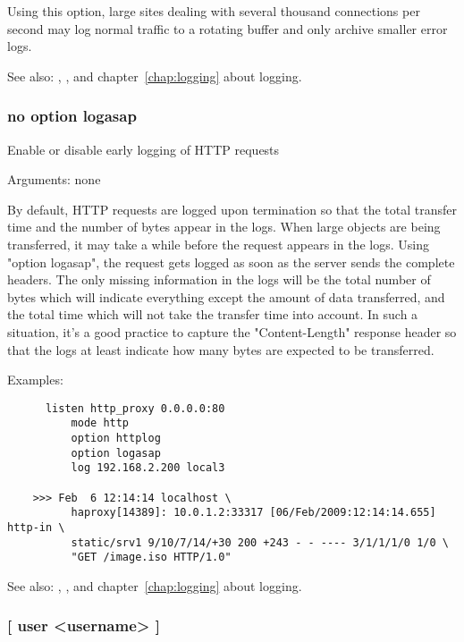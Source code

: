   Using this option, large sites dealing with several thousand connections per
  second may log normal traffic to a rotating buffer and only archive smaller
  error logs.


See also: , ,  and chapter~\ref{chap:logging} about
             logging.

\subsubsection[logasap]{}
\subsubsection*{no option logasap}


  Enable or disable early logging of HTTP requests


  Arguments: none

  By default, HTTP requests are logged upon termination so that the total
  transfer time and the number of bytes appear in the logs. When large objects
  are being transferred, it may take a while before the request appears in the
  logs. Using "option logasap", the request gets logged as soon as the server
  sends the complete headers. The only missing information in the logs will be
  the total number of bytes which will indicate everything except the amount
  of data transferred, and the total time which will not take the transfer
  time into account. In such a situation, it's a good practice to capture the
  "Content-Length" response header so that the logs at least indicate how many
  bytes are expected to be transferred.

  Examples:
\begin{verbatim}
      listen http_proxy 0.0.0.0:80
          mode http
          option httplog
          option logasap
          log 192.168.2.200 local3

    >>> Feb  6 12:14:14 localhost \
          haproxy[14389]: 10.0.1.2:33317 [06/Feb/2009:12:14:14.655] http-in \
          static/srv1 9/10/7/14/+30 200 +243 - - ---- 3/1/1/1/0 1/0 \
          "GET /image.iso HTTP/1.0"
\end{verbatim}


See also: , , and chapter~\ref{chap:logging} about
             logging.

\subsubsection[mysql-check]{\kw{option mysql-check} [ user <username> ]}
\index{mysql-check}

